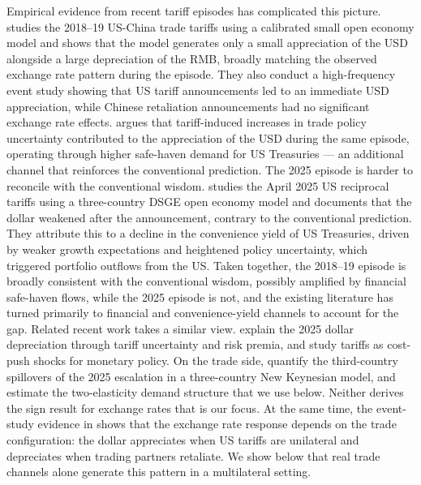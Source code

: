 \documentclass[11pt]{article}
\theoremstyle{plain}
\theoremstyle{remark}
\numberwithin{lemma}{section}
\numberwithin{proposition}{section}
\numberwithin{corollary}{section}
\newcommand{\rev}[1]{{\color{RevBlue}#1}}
\begin{document}
Empirical evidence from recent tariff episodes has complicated this picture. \cite{jeanne2024extent} studies the 2018--19 US-China trade tariffs using a calibrated small open economy model and shows that the model generates only a small appreciation of the USD alongside a large depreciation of the RMB, broadly matching the observed exchange rate pattern during the episode. They also conduct a high-frequency event study showing that US tariff announcements led to an immediate USD appreciation, while Chinese retaliation announcements had no significant exchange rate effects. \cite{khalil2024us} argues that tariff-induced increases in trade policy uncertainty contributed to the appreciation of the USD during the same episode, operating through higher safe-haven demand for US Treasuries — an additional channel that reinforces the conventional prediction. The 2025 episode is harder to reconcile with the conventional wisdom. \cite{cardani2025exchange} studies the April 2025 US reciprocal tariffs using a three-country DSGE open economy model and documents that the dollar weakened after the announcement, contrary to the conventional prediction. They attribute this to a decline in the convenience yield of US Treasuries, driven by weaker growth expectations and heightened policy uncertainty, which triggered portfolio outflows from the US. Taken together, the 2018--19 episode is broadly consistent with the conventional wisdom, possibly amplified by financial safe-haven flows, while the 2025 episode is not, and the existing literature has turned primarily to financial and convenience-yield channels to account for the gap. \rev{Related recent work takes a similar view. \cite{kalemli2025} explain the 2025 dollar depreciation through tariff uncertainty and risk premia, and \cite{werning2025} study tariffs as cost-push shocks for monetary policy. On the trade side, \cite{darracq2026} quantify the third-country spillovers of the 2025 escalation in a three-country New Keynesian model, and \cite{liqiu2022} estimate the two-elasticity demand structure that we use below. Neither derives the sign result for exchange rates that is our focus. At the same time, the event-study evidence in \cite{corsetti2025} shows that the exchange rate response depends on the trade configuration: the dollar appreciates when US tariffs are unilateral and depreciates when trading partners retaliate. We show below that real trade channels alone generate this pattern in a multilateral setting.}
\end{document}
